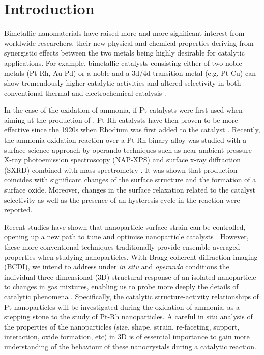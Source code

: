 \section{Introduction}

Bimetallic nanomaterials have raised more and more significant interest from worldwide researchers, their new physical and chemical properties deriving from synergistic effects between the two metals being highly desirable for catalytic applications.
For example, bimetallic catalysts consisting either of two noble metals (Pt-Rh, Au-Pd) or a noble and a 3d/4d transition metal (e.g. Pt-Cu) can show tremendously higher catalytic activities and altered selectivity in both conventional thermal and electrochemical catalysis \parencite{Resta2020a, Carnis2021b}.

In the case of the oxidation of ammonia, if Pt catalysts were first used when aiming at the production of , Pt-Rh catalysts have then proven to be more effective since the 1920s when Rhodium was first added to the catalyst \parencite{Handforth1934, Heck1982}.
Recently, the ammonia oxidation reaction over a Pt-Rh binary alloy was studied with a surface science approach by operando techniques such as near-ambient pressure X-ray photoemission spectroscopy (NAP-XPS) and surface x-ray diffraction (SXRD) combined with mass spectrometry \parencite{Resta2020a}.
It was shown that  production coincides with significant changes of the surface structure and the formation of a  surface oxide.
Moreover, changes in the surface relaxation related to the catalyst selectivity as well as the presence of an hysteresis cycle in the reaction were reported.

Recent studies have shown that nanoparticle surface strain can be controlled, opening up a new path to tune and optimise nanoparticle catalysts \parencite{Zhang2014, Sneed2015, Wang2016}.
However, these more conventional techniques traditionally provide ensemble-averaged properties when studying nanoparticles.
With Bragg coherent diffraction imaging (BCDI), we intend to address under \textit{in situ} and \textit{operando} conditions the individual three-dimensional (3D) structural response of an isolated nanoparticle to changes in gas mixtures, enabling us to probe more deeply the details of catalytic phenomena \parencite{Fernandez2019, Passos2020, Dupraz2022}.
Specifically, the catalytic structure-activity relationships of Pt nanoparticles will be investigated during the oxidation of ammonia, as a stepping stone to the study of Pt-Rh nanoparticles.
A careful in situ analysis of the properties of the nanoparticles (size, shape, strain, re-faceting, support, interaction, oxide formation, etc) in 3D is of essential importance to gain more understanding of the behaviour of these nanocrystals during a catalytic reaction.

